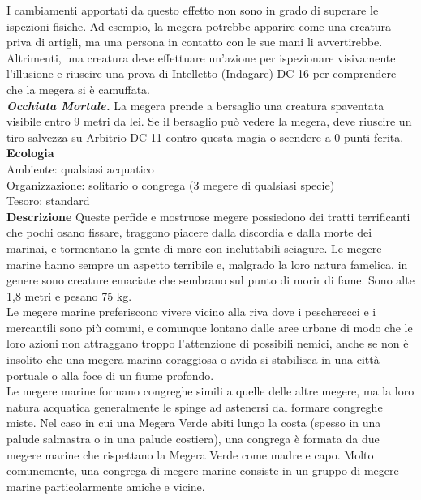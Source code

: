 \begin{multicols}{2}
I cambiamenti apportati da questo effetto non sono in grado di superare le ispezioni fisiche. Ad esempio, la megera potrebbe apparire come una creatura priva di artigli, ma una persona in contatto con le sue mani li avvertirebbe. Altrimenti, una creatura deve effettuare un'azione per ispezionare visivamente l'illusione e riuscire una prova di Intelletto (Indagare) DC 16 per comprendere che la megera si è camuffata.\\

\emph{\textbf{Occhiata Mortale.}} La megera prende a bersaglio una creatura spaventata visibile entro 9 metri da lei. Se il bersaglio può vedere la megera, deve riuscire un tiro salvezza su Arbitrio DC 11 contro questa magia o scendere a 0 punti ferita.
\textbf{Ecologia}\\
Ambiente: qualsiasi acquatico\\
Organizzazione: solitario o congrega (3 megere di qualsiasi specie)\\
Tesoro: standard\\
\textbf{Descrizione}
Queste perfide e mostruose megere possiedono dei tratti terrificanti che pochi osano fissare, traggono piacere dalla discordia e dalla morte dei marinai, e tormentano la gente di mare con ineluttabili sciagure. Le megere marine hanno sempre un aspetto terribile e, malgrado la loro natura famelica, in genere sono creature emaciate che sembrano sul punto di morir di fame. Sono alte 1,8 metri e pesano 75 kg.\\

Le megere marine preferiscono vivere vicino alla riva dove i pescherecci e i mercantili sono più comuni, e comunque lontano dalle aree urbane di modo che le loro azioni non attraggano troppo l’attenzione di possibili nemici, anche se non è insolito che una megera marina coraggiosa o avida si stabilisca in una città portuale o alla foce di un fiume profondo.\\

Le megere marine formano congreghe simili a quelle delle altre megere, ma la loro natura acquatica generalmente le spinge ad astenersi dal formare congreghe miste. Nel caso in cui una Megera Verde abiti lungo la costa (spesso in una palude salmastra o in una palude costiera), una congrega è formata da due megere marine che rispettano la Megera Verde come madre e capo. Molto comunemente, una congrega di megere marine consiste in un gruppo di megere marine particolarmente amiche e vicine.\\


\end{multicols}
